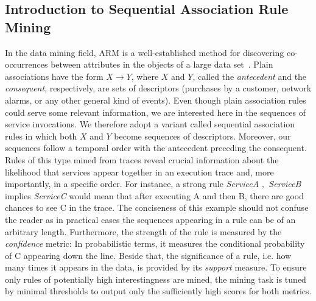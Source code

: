 \subsection{Introduction to Sequential Association Rule Mining}

\noindent In the data mining field, ARM is a
well-established method for discovering co-occurrences between attributes
in the objects of a large data set~\cite{piatetsky1991discovery}. Plain
associations have the form $X \rightarrow Y$, where $X$ and $Y$,
called the \textit{antecedent} and the \textit{consequent}, respectively, are sets of descriptors
(purchases by a customer, network alarms, or any other general kind of events).
Even though plain association rules could serve some relevant information, we are interested here in
the sequences of service invocations.
We therefore adopt a variant called sequential association rules in which
both $X$ and $Y$ become sequences of descriptors.
Moreover, our sequences follow a temporal order with the antecedent preceding the consequent. 
Rules of this type mined from traces reveal crucial
information about the likelihood that services appear together in an execution
trace and, more importantly, in a specific order. 
For instance, a strong rule \emph{ServiceA $,$ ServiceB } implies \emph{ServiceC} would mean that after executing A and then B, there are good chances to see C in the trace.
The conciseness of this example should not confuse the reader as in practical cases
the sequences appearing in a rule can be of an arbitrary length.
Furthermore, the strength of the rule is measured by the \textit{confidence} metric: In probabilistic terms,
it measures the conditional probability of C appearing down the line.
Beside that, the significance of a rule, i.e. how many times it appears in the data,
is provided by its \textit{support} measure.
To ensure only rules of potentially high interestingness are mined,
the mining task is tuned by minimal thresholds to
output only the sufficiently high scores for both metrics.
